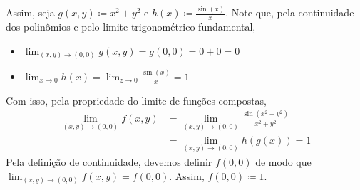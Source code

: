 \documentclass[../main.tex]{subfiles}
\begin{document}
\begin{solucao}
\begin{enumerate}[label=\alph*)]
				Assim, seja $g(x,y)\coloneq x^2+y^2$ e $h(x)\coloneq \tfrac{\sin(x)}{x}$. Note que, pela continuidade dos polinômios e pelo limite trigonométrico fundamental,
				\begin{itemize}
					\item $\lim_{(x,y)\to (0,0)} g(x,y)=g(0,0)=0+0=0$
					\item $\lim_{x\to 0} h(x)=\lim_{z\to 0} \frac{\sin(x)}{x}=1$
				\end{itemize}
				Com isso, pela propriedade do limite de funções compostas,
				\begin{align*}
					\lim_{(x,y)\to (0,0)} f(x,y)
						&=\lim_{(x,y)\to (0,0)} \tfrac{\sin(x^2+y^2)}{x^2+y^2}\\
						&=\lim_{(x,y)\to (0,0)}h(g(x))=1
				\end{align*}
				Pela definição de continuidade, devemos definir $f(0,0)$ de modo que $\lim_{(x,y)\to (0,0)}f(x,y)=f(0,0)$. Assim, $f(0,0)\coloneq 1$.
			\end{enumerate}
		\end{solucao}
\end{document}
